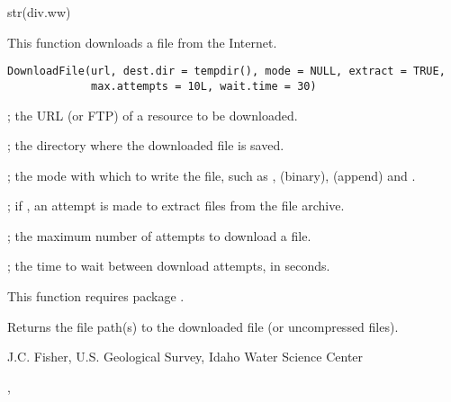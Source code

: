 \documentclass[a4paper]{book}
\begin{document}
%
\begin{Examples}
\begin{ExampleCode}
str(div.ww)
\end{ExampleCode}
\end{Examples}
%
\begin{Description}\relax
This function downloads a file from the Internet.
\end{Description}
%
\begin{Usage}
\begin{verbatim}
DownloadFile(url, dest.dir = tempdir(), mode = NULL, extract = TRUE,
             max.attempts = 10L, wait.time = 30)
\end{verbatim}
\end{Usage}
%
\begin{Arguments}
\begin{ldescription}
\item[\code{url}] ; the URL (or FTP) of a resource to be downloaded.
\item[\code{dest.dir}] ; the directory where the downloaded file is saved.
\item[\code{mode}] ; the mode with which to write the file, such as ,  (binary),  (append) and .
\item[\code{extract}] ; if , an attempt is made to extract files from the file archive.
\item[\code{max.attempts}] ; the maximum number of attempts to download a file.
\item[\code{wait.time}] ; the time to wait between download attempts, in seconds.
\end{ldescription}
\end{Arguments}
%
\begin{Details}\relax
This function requires package .
\end{Details}
%
\begin{Value}
Returns the file path(s) to the downloaded file (or uncompressed files).
\end{Value}
%
\begin{Author}\relax
J.C. Fisher, U.S. Geological Survey, Idaho Water Science Center
\end{Author}
%
\begin{SeeAlso}\relax
{}, 
\end{SeeAlso}
\end{document}
